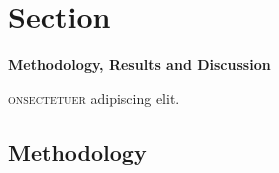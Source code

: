 
\section[Methodology, Results and Discussion]{\fontsize{\customSecFontSize}{55}\selectfont Section }
	\vspace{\customSecPreDist}
	\begin{flushleft}
		{\fontsize{\customSecFontSizeAdd}{\customSecLineDistAdd}\selectfont\bfseries Methodology, Results and Discussion\par}
	\end{flushleft}
	\vspace{\customSecPostDist}
	\label{sec:sec3.methodology_results_and_discussion}

	\vspace{\dropCapSecVertDist}\lettrine{\color{\lettrineDropCapFontColor}{C}}{onsectetuer} adipiscing elit. \blindtext

	\subsection{Methodology}
	\label{subsec:sec3.simple_test_cell_methodology}
	\blindtext[3]
